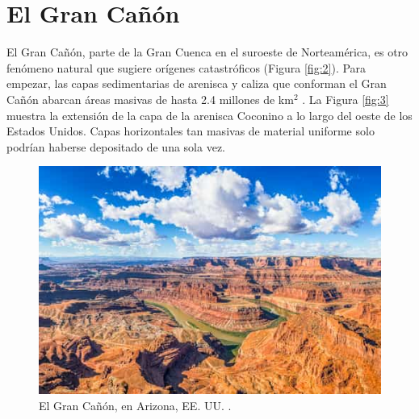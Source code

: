 \documentclass[10pt,twocolumn,letterpaper]{article}
\begin{document}
\section{El Gran Cañón}

El Gran Cañón, parte de la Gran Cuenca en el suroeste de Norteamérica, es otro fenómeno natural que sugiere orígenes catastróficos (Figura \ref{fig:2}). Para empezar, las capas sedimentarias de arenisca y caliza que conforman el Gran Cañón abarcan áreas masivas de hasta 2.4 millones de km$^2$ \cite{21}. La Figura \ref{fig:3} muestra la extensión de la capa de la arenisca Coconino a lo largo del oeste de los Estados Unidos. Capas horizontales tan masivas de material uniforme solo podrían haberse depositado de una sola vez.

\begin{figure}[b]
\begin{center}
   \includegraphics[width=1\linewidth]{grand-canyon.jpg}
\end{center}
   \caption{El Gran Cañón, en Arizona, EE. UU. \cite{49}.}
\label{fig:2}
\label{fig:onecol}
\end{figure}
\end{document}

